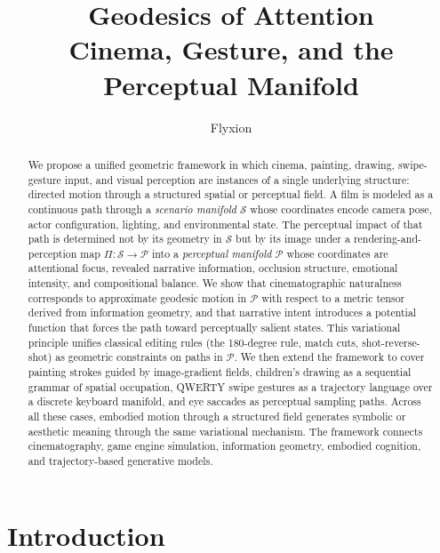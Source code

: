 \documentclass[12pt,a4paper]{article}
\title{\textbf{Geodesics of Attention}\\
\large Cinema, Gesture, and the Perceptual Manifold}
\author{Flyxion}
\date{}
\theoremstyle{plain}
\theoremstyle{definition}
\begin{document}
\maketitle
\thispagestyle{empty}

\begin{abstract}
We propose a unified geometric framework in which cinema, painting, drawing,
swipe-gesture input, and visual perception are instances of a single underlying
structure: directed motion through a structured spatial or perceptual field.
A film is modeled as a continuous path through a \emph{scenario manifold}
$\mathcal{S}$ whose coordinates encode camera pose, actor configuration,
lighting, and environmental state. The perceptual impact of that path is
determined not by its geometry in $\mathcal{S}$ but by its image under a
rendering-and-perception map $\Pi:\mathcal{S}\to\mathcal{P}$ into a
\emph{perceptual manifold} $\mathcal{P}$ whose coordinates are attentional
focus, revealed narrative information, occlusion structure, emotional intensity,
and compositional balance. We show that cinematographic naturalness corresponds
to approximate geodesic motion in $\mathcal{P}$ with respect to a metric tensor
derived from information geometry, and that narrative intent introduces a
potential function that forces the path toward perceptually salient states. This
variational principle unifies classical editing rules (the 180-degree rule, match
cuts, shot-reverse-shot) as geometric constraints on paths in $\mathcal{P}$.
We then extend the framework to cover painting strokes guided by image-gradient
fields, children's drawing as a sequential grammar of spatial occupation,
QWERTY swipe gestures as a trajectory language over a discrete keyboard manifold,
and eye saccades as perceptual sampling paths. Across all these cases, embodied
motion through a structured field generates symbolic or aesthetic meaning through
the same variational mechanism. The framework connects cinematography, game
engine simulation, information geometry, embodied cognition, and trajectory-based
generative models.
\end{abstract}

\newpage
\setcounter{page}{1}
\tableofcontents
\newpage

\section{Introduction}
\end{document}
